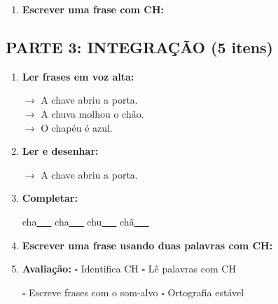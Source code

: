 \begin{exercicio}
\begin{enumerate}[resume]
  \item \textbf{Escrever uma frase com CH:}
  \begin{center}
  \underline{\hspace{12cm}}
  \end{center}

\end{enumerate}

\subsection*{PARTE 3: INTEGRAÇÃO (5 itens)}

\begin{enumerate}[resume]

  \item \textbf{Ler frases em voz alta:}
  \begin{center}
  $\rightarrow$ A chave abriu a porta.\\
  $\rightarrow$ A chuva molhou o chão.\\
  $\rightarrow$ O chapéu é azul.\\
  \end{center}

  \item \textbf{Ler e desenhar:}
  \begin{center}
  $\rightarrow$ A chave abriu a porta.
  \end{center}
  \begin{center}
  \end{center}

  \item \textbf{Completar:}
  \begin{center}
  cha\underline{~~~} \quad cha\underline{~~~} \quad chu\underline{~~~} \quad chã\underline{~~~}
  \end{center}

  \item \textbf{Escrever uma frase usando duas palavras com CH:}
  \begin{center}
  \underline{\hspace{12cm}}
  \end{center}

  \item \textbf{Avaliação:} $\square$ Identifica CH \quad $\square$ Lê palavras com CH
  \begin{center}
  $\square$ Escreve frases com o som-alvo \quad $\square$ Ortografia estável
  \end{center}


\end{enumerate}
\end{exercicio}
